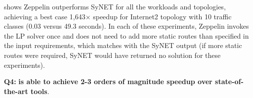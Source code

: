 shows Zeppelin outperforms SyNET 
for all the workloads and topologies, achieving a best case 1,643$\times$
speedup 
 for Internet2 topology with 10 traffic classes 
(0.03 versus 49.3 seconds). In each of these experiments, Zeppelin 
invokes the LP solver once and does not need to add more static routes
than specified in the input requirements, which matches with the SyNET 
output (if more static routes were required, SyNET would have returned 
no solution for these experiments). 

\textbf{Q4:} 
\textbf{\name is 
able to achieve 2-3 orders of magnitude speedup over state-of-the-art tools}.